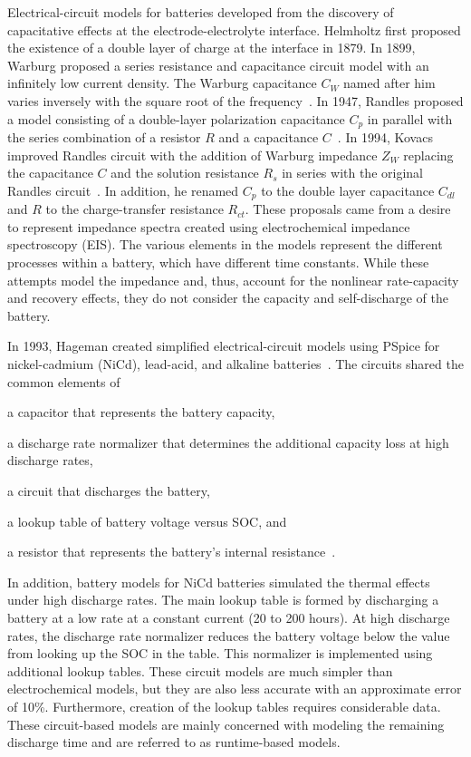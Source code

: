 \documentclass[../zhang_thesis.tex]{subfiles}
\begin{document}
Electrical-circuit models for batteries developed from the discovery of capacitative effects at the electrode-electrolyte interface. Helmholtz first proposed the existence of a double layer of charge at the interface in 1879. In 1899, Warburg proposed a series resistance and capacitance circuit model with an infinitely low current density. The Warburg capacitance $C_W$ named after him varies inversely with the square root of the frequency~\cite{geddes97}. In 1947, Randles proposed a model
consisting of a double-layer polarization capacitance $C_p$ in parallel with the series combination of a resistor $R$ and a capacitance $C$~\cite{randles47}. In 1994, Kovacs improved Randles circuit with the addition of Warburg impedance $Z_W$ replacing the capacitance $C$ and the solution resistance $R_s$ in series with the original Randles circuit~\cite{kovacs95}. In addition, he renamed $C_p$ to the double layer capacitance $C_{dl}$ and $R$ to the charge-transfer resistance
$R_{ct}$. These proposals came from a desire to represent impedance spectra created using electrochemical impedance spectroscopy (EIS). The various elements in the models represent the different processes within a battery, which have different time constants. While these attempts model the impedance and, thus, account for the nonlinear rate-capacity and recovery effects, they do not consider the capacity and self-discharge of the battery.

In 1993, Hageman created simplified electrical-circuit models using PSpice for nickel-cadmium (NiCd), lead-acid, and alkaline batteries~\cite{hageman93}. The circuits shared the common elements of
\begin{enumerate*}[label=\emph{\roman*})]
\item a capacitor that represents the battery capacity,
\item a discharge rate normalizer that determines the additional capacity loss at high discharge rates,
\item a circuit that discharges the battery,
\item a lookup table of battery voltage versus SOC, and
\item a resistor that represents the battery's internal resistance~\cite{hageman93,hageman97}.
\end{enumerate*}
In addition, battery models for NiCd batteries simulated the thermal effects under high discharge rates. The main lookup table is formed by discharging a battery at a low rate at a constant current (20 to 200 hours). At high discharge rates, the discharge rate normalizer reduces the battery voltage below the value from looking up the SOC in the table. This normalizer is implemented using additional lookup tables. These circuit models are much simpler than electrochemical models, but they
are also less accurate with an approximate error of 10\%. Furthermore, creation of the lookup tables requires considerable data. These circuit-based models are mainly concerned with modeling the remaining discharge time and are referred to as runtime-based models.
\end{document}
